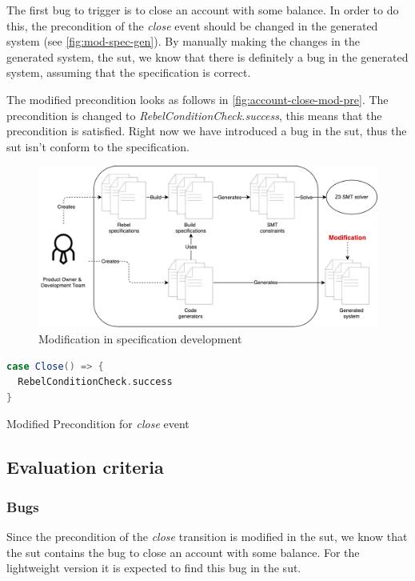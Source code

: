The first bug to trigger is to close an account with some balance. In order to do this, the precondition of the \textit{close} event should be changed in the generated system (see \autoref{fig:mod-spec-gen}). By manually making the changes in the generated system, the \gls{sut}, we know that there is definitely a bug in the generated system, assuming that the specification is correct.

The modified precondition looks as follows in
\autoref{fig:account-close-mod-pre}. The precondition is changed to
\textit{RebelConditionCheck.success}, this means that the precondition is
satisfied. Right now we have introduced a bug in the \gls{sut},
thus the \gls{sut} isn't conform to the specification.

\begin{figure}[h!]
  \centering
  \includegraphics[width=\linewidth{}]{figures/modified-sut.pdf}
  \caption{Modification in specification development}\label{fig:mod-spec-gen}
\end{figure}
\FloatBarrier

\begin{sourcecode}[h!]
\begin{lstlisting}[language=scala]
case Close() => {
  RebelConditionCheck.success
}
\end{lstlisting}
\caption{Modified Precondition for \textit{close} event}\label{fig:account-close-mod-pre}
\end{sourcecode}
\FloatBarrier

\subsection{Evaluation criteria}\label{sec:ch4-eval-criteria}

\subsubsection{Bugs}
Since the precondition of the \textit{close} transition is modified in the \gls{sut},
we know that the \gls{sut} contains the bug to close an account with some balance. For
the lightweight version it is expected to find this bug in the \gls{sut}.

